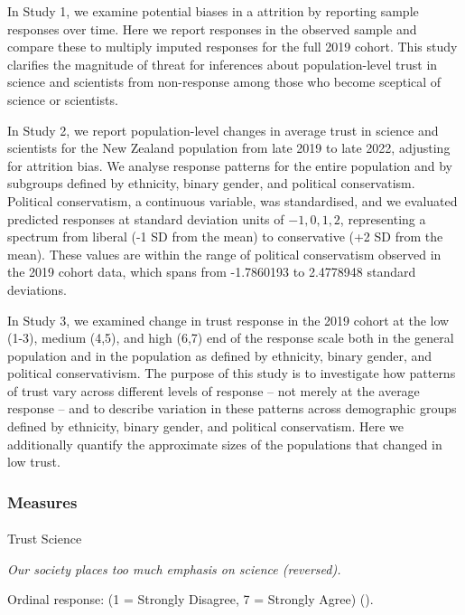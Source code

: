 \documentclass[
  single column]{article}
\makeatletter
\let\oldparagraph\paragraph
\renewcommand{\paragraph}{
    \@ifstar
      \xxxParagraphStar
      \xxxParagraphNoStar
  }
\newcommand{\xxxParagraphStar}[1]{\oldparagraph*{#1}\mbox{}}
\newcommand{\xxxParagraphNoStar}[1]{\oldparagraph{#1}\mbox{}}
\makeatother
\begin{document}
In Study 1, we examine potential biases in a attrition by reporting
sample responses over time. Here we report responses in the observed
sample and compare these to multiply imputed responses for the full 2019
cohort. This study clarifies the magnitude of threat for inferences
about population-level trust in science and scientists from non-response
among those who become sceptical of science or scientists.

In Study 2, we report population-level changes in average trust in
science and scientists for the New Zealand population from late 2019 to
late 2022, adjusting for attrition bias. We analyse response patterns
for the entire population and by subgroups defined by ethnicity, binary
gender, and political conservatism. Political conservatism, a continuous
variable, was standardised, and we evaluated predicted responses at
standard deviation units of \({-1, 0, 1, 2}\), representing a spectrum
from liberal (-1 SD from the mean) to conservative (+2 SD from the
mean). These values are within the range of political conservatism
observed in the 2019 cohort data, which spans from -1.7860193 to
2.4778948 standard deviations.

In Study 3, we examined change in trust response in the 2019 cohort at
the low (1-3), medium (4,5), and high (6,7) end of the response scale
both in the general population and in the population as defined by
ethnicity, binary gender, and political conservativism. The purpose of
this study is to investigate how patterns of trust vary across different
levels of response -- not merely at the average response -- and to
describe variation in these patterns across demographic groups defined
by ethnicity, binary gender, and political conservatism. Here we
additionally quantify the approximate sizes of the populations that
changed in low trust.

\subsubsection{Measures}\label{measures-1}

\paragraph{Trust Science}\label{trust-science-1}

\emph{Our society places too much emphasis on science (reversed).}

Ordinal response: (1 = Strongly Disagree, 7 = Strongly Agree)
().
\end{document}
